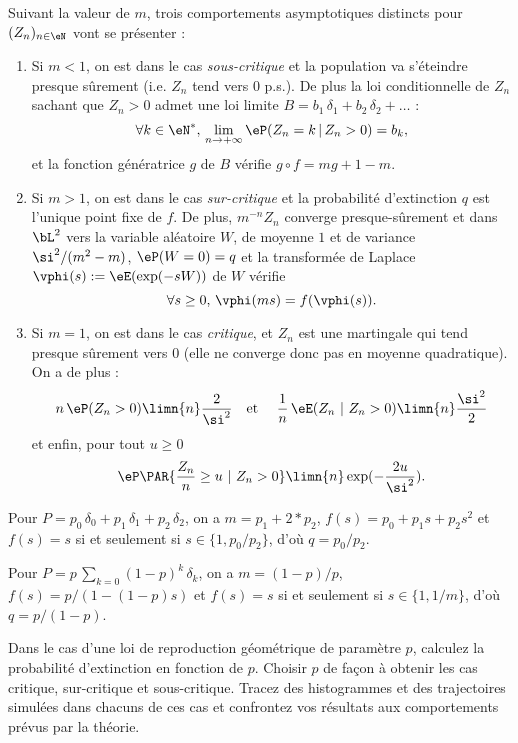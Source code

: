 {{Suivant la valeur de $m$, trois comportements asymptotiques distincts pour
$(Z_n)_{n\in\eN}$ vont se présenter :
\begin{enumerate}
\item Si $m<1$, on est dans le cas \emph{sous-critique} et la population va
  s'éteindre presque sûrement (i.e. $Z_n$ tend vers $0$ p.s.). De plus la loi
  conditionnelle de $Z_n$ sachant que $Z_n>0$ admet une loi limite
  $B=b_1\,\delta_1+b_2\,\delta_2+\ldots$ :
  $$
  \forall k\in\eN^*,\,\lim_{n\to+\infty} \eP(Z_n=k\,\vert\,Z_n>0) = b_k,
  $$
  et la fonction génératrice $g$ de $B$ vérifie $g\circ f=mg+1-m$.
\item Si $m >1$, on est dans le cas \emph{sur-critique} et la probabilité
  d'extinction $q$ est l'unique point fixe de $f$.  De plus, $m^{-n} Z_n$
  converge presque-sûrement et dans $\bL^2$ vers la variable aléatoire $W$, de
  moyenne $1$ et de variance $\si^2/(m^2-m)$, $\eP(W=0)=q$ et la transformée
  de Laplace $\vphi(s):=\eE(\exp(-sW))$ de $W$ vérifie
  $$
  \forall s\geq 0,\,\vphi(ms)=f(\vphi(s)).
  $$
\item Si $m =1$, on est dans le cas \emph{critique}, et $Z_n$ est une
  martingale qui tend presque sûrement vers $0$ (elle ne converge donc pas en
  moyenne quadratique). On a de plus :
  $$
   n\,\eP(Z_n>0) \limn{n} \frac{2}{\si^2}
   \text{\quad et \quad} 
   \frac{1}{n}\,\eE(Z_n\ |\ Z_n>0) \limn{n} \frac{\si^2}{2}
   $$
   et enfin, pour tout $u\geq 0$
  $$
  \eP\PAR{\frac{Z_n}{n} \geq u\ |\ Z_n>0} \limn{n} \exp(-\frac{2u}{\si^2}).
  $$
\end{enumerate}

Pour $P=p_0\,\delta_0+p_1\,\delta_1+p_2\,\delta_2$, on a $m=p_1+2*p_2$,
$f(s)=p_0+p_1s+p_2s^2$ et $f(s)=s$ si et seulement si
$s\in\{1,p_0/p_2\}$, d'où $q=p_0/p_2$.

%
%

Pour $P=p\,\sum_{k=0} (1-p)^k\,\delta_k$, on a $m=(1-p)/p$,
$f(s)=p/(1-(1-p)s)$ et $f(s)=s$ si et seulement si $s\in\{1,1/m\}$,
d'où $q=p/(1-p)$.

%
%

%
%

%
%

%
%

\begin{exo}
Dans le cas d'une loi de reproduction géométrique de paramètre $p$,
calculez la probabilité d'extinction en fonction de $p$. Choisir $p$
de façon à obtenir les cas critique, sur-critique et sous-critique.
Tracez des histogrammes et des trajectoires simulées dans chacuns de
ces cas et confrontez vos résultats aux comportements prévus par la
théorie.
\end{exo}

}}
